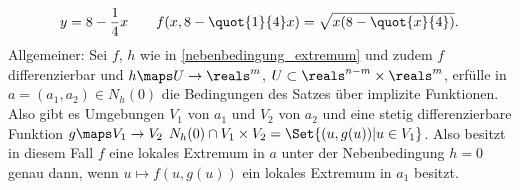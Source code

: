 \begin{equation*}
  y=8-\frac{1}{4}x\qquad f(x,8-\quot{1}{4}x)=\sqrt{x(8-\quot{x}{4})}.
\end{equation*}
Allgemeiner: Sei \( f \), \( h \) wie in \ref{nebenbedingung_extremum} und zudem \( f \) differenzierbar und \( h\maps U\to \reals^m \), \( U\subset \reals^{n-m}\times \reals^m \), erfülle in \( a=(a_1,a_2)\in N_h(0) \) die Bedingungen des Satzes über implizite Funktionen. Also gibt es Umgebungen \( V_1 \) von \( a_1 \) und \( V_2 \) von \( a_2 \) und eine stetig differenzierbare Funktion \( g\maps V_1\to V_2 \) \sd \( N_h(0)\cap V_1\times V_2=\Set{(u,g(u))|u\in V_1} \). Also besitzt in diesem Fall \( f \) eine lokales Extremum in \( a \) unter der Nebenbedingung \( h=0 \) genau dann, wenn \( u\mapsto f(u,g(u)) \) ein lokales Extremum in \( a_1 \) besitzt.

